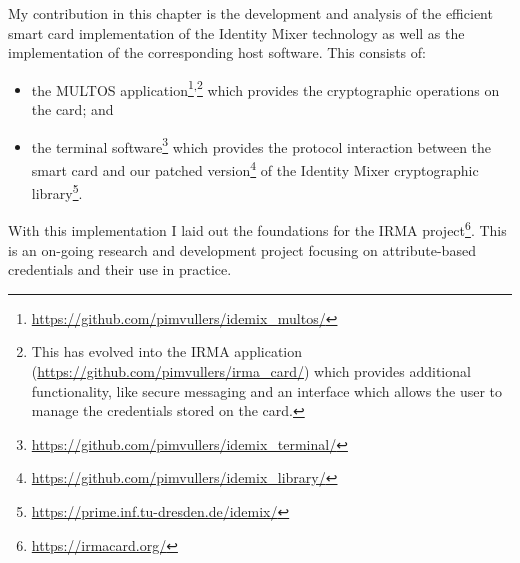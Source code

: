 My contribution in this chapter is the development and analysis of the efficient
smart card implementation of the Identity Mixer technology as well as the
implementation of the corresponding host software. This consists of:
\begin{itemize}
  \item the MULTOS application\footnote{\url{https://github.com/pimvullers/idemix_multos/}
    }\textsuperscript{,}\footnote{This has evolved into the IRMA application
    (\url{https://github.com/pimvullers/irma_card/}) which provides additional
    functionality, like secure messaging and an interface which allows the user
    to manage the credentials stored on the card.}
    which provides the cryptographic operations on the card; and
  \item the terminal software\footnote{\url{https://github.com/pimvullers/idemix_terminal/}}
    which provides the protocol interaction between the smart card and our
    patched version\footnote{\url{https://github.com/pimvullers/idemix_library/}}
    of the Identity Mixer cryptographic library\footnote{\url{https://prime.inf.tu-dresden.de/idemix/}}.
\end{itemize}

With this implementation I laid out the foundations %
for the IRMA project\footnote{\url{https://irmacard.org/}}. This is an on-going
research and development project focusing on attribute-based credentials and
their use in practice.